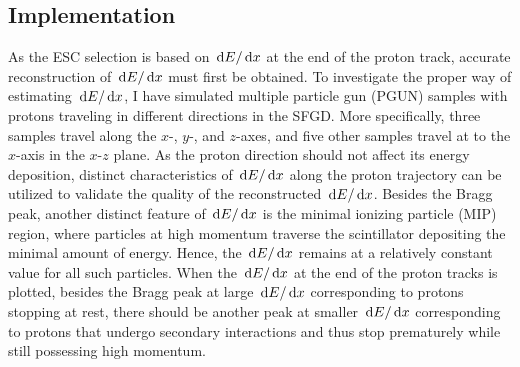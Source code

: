    \subsection{Implementation}
   \label{sec:sel-esc-imp}
	As the ESC selection is based on $\,\textrm{d}E/\,\textrm{d}x$ at the end of the proton track, accurate reconstruction of $\,\textrm{d}E/\,\textrm{d}x$ must first be obtained.
	To investigate the proper way of estimating $\,\textrm{d}E/\,\textrm{d}x$, I have simulated multiple particle gun (PGUN) samples with protons traveling in different directions in the SFGD.
	More specifically, three samples travel along the $x$-, $y$-, and $z$-axes, and five other samples travel at  to the $x$-axis in the $x$-$z$ plane.
	As the proton direction should not affect its energy deposition, distinct characteristics of $\,\textrm{d}E/\,\textrm{d}x$ along the proton trajectory can be utilized to validate the quality of the reconstructed $\,\textrm{d}E/\,\textrm{d}x$.
	Besides the Bragg peak, another distinct feature of $\,\textrm{d}E/\,\textrm{d}x$ is the minimal ionizing particle (MIP) region, where particles at high momentum traverse the scintillator depositing the minimal amount of energy. 
	Hence, the $\,\textrm{d}E/\,\textrm{d}x$ remains at a relatively constant value for all such particles.
	When the $\,\textrm{d}E/\,\textrm{d}x$ at the end of the proton tracks is plotted, besides the Bragg peak at large $\,\textrm{d}E/\,\textrm{d}x$ corresponding to protons stopping at rest, there should be another peak at smaller $\,\textrm{d}E/\,\textrm{d}x$ corresponding to protons that undergo secondary interactions and thus stop prematurely while still possessing high momentum.

